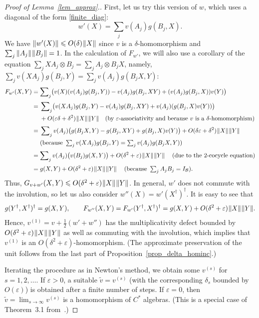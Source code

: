 \documentclass[12pt]{article}
\newcommand{\calB}{\mathcal{B}}
\newcommand{\ts}{\mkern1mu}
\newcommand{\eps}{\varepsilon}
\renewcommand{\le}{\leqslant}
\newtheorem[definition]{Definition}[Theorem]{Definition}
\newtheorem[remark]{Example}[Theorem]{Example}
\newtheorem[remark]{Remark}[Theorem]{Remark}
\newtheorem[remark]{Question}[Theorem]{Open question}
\newtheorem*[definition]{definition}{Definition}
\newtheorem*[remark]{example}{Example}
\newtheorem*[remark]{remark}{Remark}
\newtheorem*[remark]{question}{Open question}
\numberwithin{equation}{section}
\begin{document}
\begin{proof}[Proof of Lemma~\ref{lem_approx}.]
First, let us try this version of $w$, which uses a diagonal of the form \eqref{finite_diag}:
\begin{equation}
w'(X) = \sum_{j}v(A_j)g(B_j,X).
\end{equation}
We have $\|w'(X)\|\le O(\delta)\ts\|X\|$ since $v$ is a $\delta$-homomorphism and $\sum_{j}\|A_j\|\ts\|B_j\|=1$. In the calculation of $F_{w'}$, we will also use a corollary of the equation $\sum_{j}XA_j\otimes B_j=\sum_{j}A_j\otimes B_jX$, namely, $\sum_{j}v(XA_j)g(B_j,Y) =\sum_{j}v(A_j)g(B_jX,Y)$:
\begin{align}\label{g1_calc}
F_{w'}(X,Y) &=\sum\nolimits_j
\bigl(v(X)(v(A_j)g(B_j,Y))-v(A_j)g(B_j,XY)+(v(A_j)g(B_j,X))v(Y)\bigr)
\nonumber\\[2pt]
&= \begin{aligned}[t]
&\sum\nolimits_j
\bigl(v(XA_j)g(B_j,Y)-v(A_j)g(B_j,XY)+v(A_j)(g(B_j,X)v(Y))\bigr)\\
&+O(\eps\delta+\delta^2)\ts\|X\|\ts\|Y\|\quad
\textstyle (\text{by $\eps$-associativity and because $v$ is a $\delta$-homomorphism})
\end{aligned}
\nonumber\\[2pt]
&= \begin{aligned}[t]
&\sum\nolimits_{j}v(A_j)\bigl(g(B_jX,Y)-g(B_j,XY)+g(B_j,X)v(Y)\bigr)
+O(\delta\eps+\delta^2)\ts\|X\|\ts\|Y\|\\
&\textstyle (\text{because } \sum_{j}v(XA_j)g(B_j,Y)=\sum_{j}v(A_j)g(B_jX,Y))
\end{aligned}
\nonumber\\[2pt]
&= \sum\nolimits_{j}v(A_j)\bigl(v(B_j)g(X,Y)\bigr)+O(\delta^2+\eps)\ts\|X\|\ts\|Y\|\quad\:
(\text{due to the 2-cocycle equation})
\nonumber\\[2pt]
&=g(X,Y)+O(\delta^2+\eps)\ts\|X\|\ts\|Y\|\quad\:
{\textstyle (\text{because } \sum\nolimits_jA_jB_j=I_\calB)}.
\end{align}
Thus, $G_{v+w'}(X,Y)\le O(\delta^2+\eps)\ts\|X\|\ts\|Y\|$. In general, $w'$ does not commute with the involution, so let us also consider $w''(X)=w'(X^\dag)^\dag$. It is easy to see that
\[
g(Y^\dag,X^\dag)^\dag=g(X,Y),\qquad 
F_{w''}(X,Y)=F_{w'}(Y^\dag,X^\dag)^\dag
=g(X,Y)+O(\delta^2+\eps)\ts\|X\|\ts\|Y\|.
\]
Hence, $v^{(1)}=v+\frac{1}{2}(w'+w'')$ has the multiplicativity defect bounded by $O(\delta^2+\eps)\ts\|X\|\ts\|Y\|$ as well as commuting with the involution, which implies that $v^{(1)}$ is an $O(\delta^2+\eps)$-homomorphism. (The approximate preservation of the unit follows from the last part of Proposition~\ref{prop_delta_hominc}.)

Iterating the procedure as in Newton's method, we obtain some $v^{(s)}$ for $s=1,2,\ldots$. If $\eps>0$, a suitable $\tilde{v}=v^{(s)}$ (with the corresponding $\delta_s$ bounded by $O(\eps)$) is obtained after a finite number of steps. If $\eps=0$, then $\tilde{v}=\lim_{s\to\infty}v^{(s)}$ is a homomorphism of $C^*$ algebras. (This is a special case of Theorem~3.1 from~\cite{Joh88}.)
\end{proof}
\end{document}
